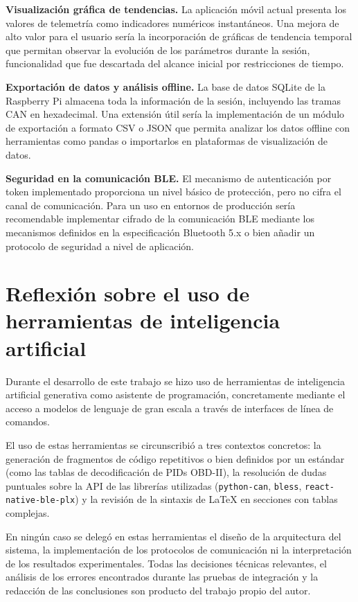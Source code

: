\textbf{Visualización gráfica de tendencias.} La aplicación móvil actual presenta los valores de telemetría como indicadores numéricos instantáneos. Una mejora de alto valor para el usuario sería la incorporación de gráficas de tendencia temporal que permitan observar la evolución de los parámetros durante la sesión, funcionalidad que fue descartada del alcance inicial por restricciones de tiempo.

\textbf{Exportación de datos y análisis offline.} La base de datos SQLite de la Raspberry Pi almacena toda la información de la sesión, incluyendo las tramas CAN en hexadecimal. Una extensión útil sería la implementación de un módulo de exportación a formato CSV o JSON que permita analizar los datos offline con herramientas como pandas o importarlos en plataformas de visualización de datos.

\textbf{Seguridad en la comunicación BLE.} El mecanismo de autenticación por token implementado proporciona un nivel básico de protección, pero no cifra el canal de comunicación. Para un uso en entornos de producción sería recomendable implementar cifrado de la comunicación BLE mediante los mecanismos definidos en la especificación Bluetooth 5.x o bien añadir un protocolo de seguridad a nivel de aplicación.


\section{Reflexión sobre el uso de herramientas de inteligencia artificial}
\label{sec:uso_ia}

Durante el desarrollo de este trabajo se hizo uso de herramientas de inteligencia artificial generativa como asistente de programación, concretamente mediante el acceso a modelos de lenguaje de gran escala a través de interfaces de línea de comandos.

El uso de estas herramientas se circunscribió a tres contextos concretos: la generación de fragmentos de código repetitivos o bien definidos por un estándar (como las tablas de decodificación de PIDs OBD-II), la resolución de dudas puntuales sobre la API de las librerías utilizadas (\texttt{python-can}, \texttt{bless}, \texttt{react-native-ble-plx}) y la revisión de la sintaxis de LaTeX en secciones con tablas complejas.

En ningún caso se delegó en estas herramientas el diseño de la arquitectura del sistema, la implementación de los protocolos de comunicación ni la interpretación de los resultados experimentales. Todas las decisiones técnicas relevantes, el análisis de los errores encontrados durante las pruebas de integración y la redacción de las conclusiones son producto del trabajo propio del autor.

